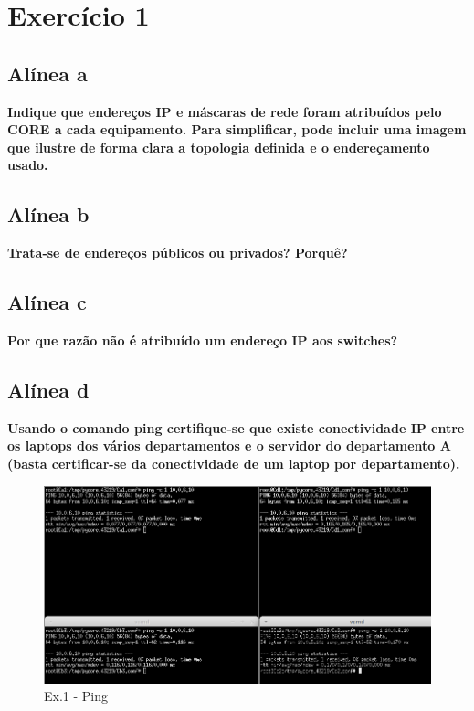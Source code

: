 \documentclass[a4paper]{report}
\begin{document}
\section{Exercício 1}

\subsection{Alínea a}
\textbf{Indique que endereços IP e máscaras de rede foram atribuídos pelo CORE a cada
equipamento. Para simplificar, pode incluir uma imagem que ilustre de forma clara a
topologia definida e o endereçamento usado.}

\subsection{Alínea b}
\textbf{Trata-se de endereços públicos ou privados? Porquê?}

\subsection{Alínea c}
\textbf{Por que razão não é atribuído um endereço IP aos switches?}

\subsection{Alínea d}
\textbf{Usando o comando ping certifique-se que existe conectividade IP entre 
os laptops dos vários departamentos e o servidor do departamento A 
(basta certificar-se da conectividade de um laptop por departamento).}

\begin{figure}[H]
    \centering 
    \includegraphics[width=\textwidth]{images/pingEx1P2.png}
    \caption{Ex.1 - Ping}
    \label{fig:pingEx1P2}
\end{figure}
\end{document}
